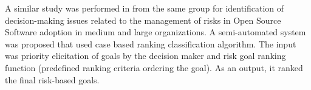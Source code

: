 	A similar study was performed in \cite{7320432} from the same group
\cite{PAvesani} for identification of decision-making issues related to the
management of risks in Open Source Software adoption in medium and large
organizations. A semi-automated system was proposed that used case based
ranking classification algorithm. The input was priority elicitation of goals by
the decision maker and risk goal ranking function (predefined ranking criteria
ordering the goal). As an output, it ranked the final risk-based goals.



